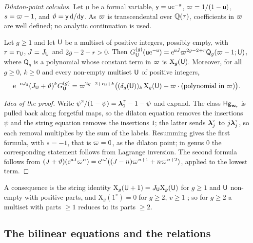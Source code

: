 \emph{Dilaton-point calculus.} Let $\mathsf{u}$ be a formal variable, $\mathsf{y}=\mathsf{u}\mathrm{e}^{-\mathsf{u}}$, $\varpi=1/(1-\mathsf{u})$, $s=\varpi-1$, and $\vartheta=\mathsf{y}\,\mathrm{d}/\mathrm{d}\mathsf{y}$. As $\varpi$ is transcendental over $\mathbb{Q}(\tau)$, coefficients in $\varpi$ are well defined; no analytic continuation is used.

\begin{lem}\label{lem:van-dil}
Let $g\geq1$ and let $\mathsf{U}$ be a multiset of positive integers, possibly empty, with $r=r_{\mathsf{U}}$, $J=J_{\mathsf{U}}$ and $2g-2+r>0$. Then $G^{(g)}_{\mathsf{U}}(\mathsf{u}\mathrm{e}^{-\mathsf{u}})=\mathrm{e}^{\mathsf{u} J}\varpi^{2g-2+r}\mathsf{Q}_g(\varpi-1;\mathsf{U})$, where $\mathsf{Q}_g$ is a polynomial whose constant term in $\varpi$ is $\mathrm{X}_g(\mathsf{U})$. Moreover, for all $g\geq 0$, $k\geq 0$ and every non-empty multiset $\mathsf{U}$ of positive integers,
\begin{equation}\label{eq:van-lead}
\mathrm{e}^{-\mathsf{u} J_{\mathsf{U}}}(J_{\mathsf{U}}+\vartheta)^kG^{(g)}_{\mathsf{U}}=\varpi^{2g-2+r_{\mathsf{U}}+k}\bigl((\delta_g(\mathsf{U}))_k\,\mathrm{X}_g(\mathsf{U})+\varpi\cdot(\text{polynomial in }\varpi)\bigr).
\end{equation}
\end{lem}

\begin{proof}[Idea of the proof]
Write $\psi^2/(1-\psi)=\boldsymbol{\lambda}^{\tau}_1-1-\psi$ and expand. The class $\mathsf{Hg}_{\mathbf{w}_{\!\tau}}$ is pulled back along forgetful maps, so the dilaton equation removes the insertions $\psi$ and the string equation removes the insertions $1$; the latter sends $\boldsymbol{\lambda}^{\tau}_j$ to $j\boldsymbol{\lambda}^{\tau}_j$, so each removal multiplies by the sum of the labels. Resumming gives the first formula, with $s=-1$, that is $\varpi=0$, as the dilaton point; in genus $0$ the corresponding statement follows from Lagrange inversion. The second formula follows from $(J+\vartheta)(\mathrm{e}^{\mathsf{u} J}\varpi^n)=\mathrm{e}^{\mathsf{u} J}((J-n)\varpi^{n+1}+n\varpi^{n+2})$, applied to the lowest term.
\end{proof}

A consequence is the string identity $\mathrm{X}_g(\mathsf{U}+1)=J_{\mathsf{U}}\mathrm{X}_g(\mathsf{U})$ for $g\geq1$ and $\mathsf{U}$ non-empty with positive parts, and $\mathrm{X}_g(1^v)=0$ for $g\geq2$, $v\geq1$ ; so for $g\geq2$ a multiset with parts $\geq1$ reduces to its parts $\geq2$.

\subsection{The bilinear equations and the relations}
\label{sec:van-bil}

